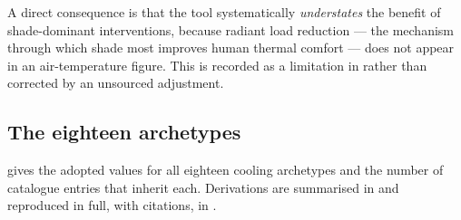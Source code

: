 A direct consequence is that the tool systematically \emph{understates} the
benefit of shade-dominant interventions, because radiant load reduction --- the
mechanism through which shade most improves human thermal comfort --- does not
appear in an air-temperature figure. This is recorded as a limitation in
 rather than corrected by an unsourced adjustment.

\subsection{The eighteen archetypes}
\label{sec:adopted}

 gives the adopted values for all eighteen cooling
archetypes and the number of catalogue entries that inherit each. Derivations
are summarised in  and reproduced in full, with citations,
in .

